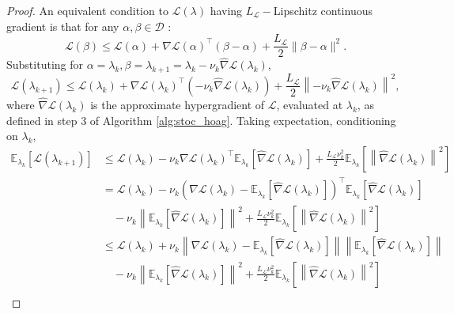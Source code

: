 \documentclass[11pt, twoside]{report}
\begin{document}
\begin{proof}
    An equivalent condition to $\mathcal{L}(\lambda)$ having $L_{\mathcal{L}}-$Lipschitz continuous gradient is that for any $\alpha,\beta \in \mathcal{D}$ \cite{Zhou2018}:
\begin{equation} \label{lipschitz_equiv}
    \mathcal{L}(\beta) \leq \mathcal{L}(\alpha) + \nabla \mathcal{L}(\alpha)^\top (\beta - \alpha) + \frac{L_{\mathcal{L}}}{2}\|\beta - \alpha\|^2.
\end{equation}
Substituting for $\alpha = \lambda_k, \beta = \lambda_{k+1} = \lambda_k - \nu_k\widehat{\nabla}\mathcal{L}(\lambda_k)$,
\[\mathcal{L}(\lambda_{k+1}) \leq \mathcal{L}(\lambda_k) + \nabla \mathcal{L}(\lambda_k)^\top \left(-\nu_k\widehat{\nabla}\mathcal{L}(\lambda_k)\right) + \frac{L_{\mathcal{L}}}{2}\left\|-\nu_k\widehat{\nabla}\mathcal{L}(\lambda_k)\right\|^2,\]
where $\widehat{\nabla} \mathcal{L}(\lambda_k)$ is the approximate hypergradient of $\mathcal{L}$, evaluated at $\lambda_k$, as defined in step 3 of Algorithm \ref{alg:stoc_hoag}. Taking expectation, conditioning on $\lambda_k$,
\begin{align*}
\mathbb{E}_{\lambda_k}\left[\mathcal{L}(\lambda_{k+1})\right] &\leq \mathcal{L}(\lambda_k) -\nu_k \nabla \mathcal{L}(\lambda_k)^\top \mathbb{E}_{\lambda_k}\left[\widehat{\nabla}\mathcal{L}(\lambda_k)\right] + \frac{L_{\mathcal{L}}\nu_k^2 }{2}\mathbb{E}_{\lambda_k}\left[\left\|\widehat{\nabla}\mathcal{L}(\lambda_k)\right\|^2\right] \\
&= \mathcal{L}(\lambda_k) 
- \nu_k \left( \nabla \mathcal{L}(\lambda_k) 
    - \mathbb{E}_{\lambda_k}\left[ \widehat{\nabla} \mathcal{L}(\lambda_k) \right] \right)^\top 
    \mathbb{E}_{\lambda_k}\left[ \widehat{\nabla} \mathcal{L}(\lambda_k) \right] \\
&\quad 
- \nu_k \left\| \mathbb{E}_{\lambda_k} \left[ \widehat{\nabla} \mathcal{L}(\lambda_k) \right] \right\|^2 
+ \frac{L_{\mathcal{L}} \nu_k^2}{2} 
    \mathbb{E}_{\lambda_k} \left[ \left\| \widehat{\nabla} \mathcal{L}(\lambda_k) \right\|^2 \right] \\
&\leq \mathcal{L}(\lambda_k) 
+ \nu_k \left\| \nabla \mathcal{L}(\lambda_k) 
    - \mathbb{E}_{\lambda_k} \left[ \widehat{\nabla} \mathcal{L}(\lambda_k) \right] \right\| 
    \left\| \mathbb{E}_{\lambda_k} \left[ \widehat{\nabla} \mathcal{L}(\lambda_k) \right] \right\| \\
&\quad 
- \nu_k \left\| \mathbb{E}_{\lambda_k} \left[ \widehat{\nabla} \mathcal{L}(\lambda_k) \right] \right\|^2 
+ \frac{L_{\mathcal{L}} \nu_k^2}{2} 
  \mathbb{E}_{\lambda_k} \left[ \left\| \widehat{\nabla} \mathcal{L}(\lambda_k) \right\|^2 \right]\\

\end{align*}
\end{proof}
\end{document}
